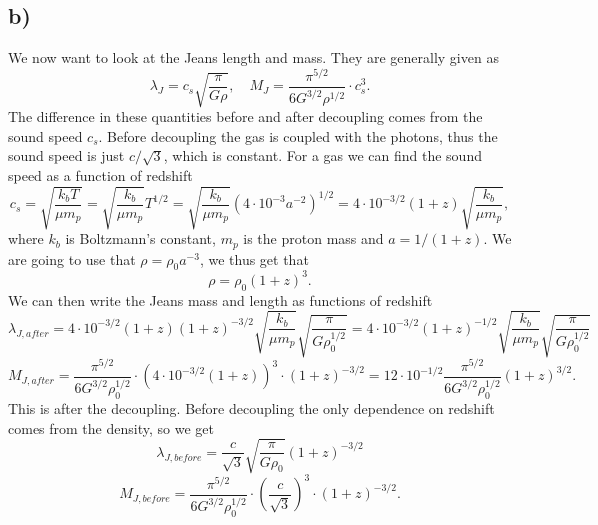 \documentclass[a4paper,norsk, 10pt]{article}
\begin{document}
\subsection{b)}
We now want to look at the Jeans length and mass. They are generally given as
\begin{equation}
\lambda_{J} = c_{s}\sqrt{\frac{\pi}{G \rho}}, \quad M_{J} = \frac{\pi^{5/2}}{6G^{3/2}\rho^{1/2}}\cdot c_s^{3}.
\end{equation}
The difference in these quantities before and after decoupling comes from the sound speed $c_s$. Before decoupling the gas is coupled with the photons, thus the sound speed is just $c/\sqrt{3}$, which is constant. For a gas we can find the sound speed as a function of redshift
\begin{equation}
c_s = \sqrt{\frac{k_b T}{\mu m_p}} = \sqrt{\frac{k_b}{\mu m_p}}T^{1/2} = \sqrt{\frac{k_b}{\mu m_p}}\left(4\cdot 10^{-3}a^{-2}\right)^{1/2} = 4\cdot 10^{-3/2}(1+z)\sqrt{\frac{k_b}{\mu m_p}},
\end{equation}
where $k_b$ is Boltzmann's constant, $m_p$ is the proton mass and $a = 1/(1+z)$. We are going to use that $\rho = \rho_0 a^{-3}$, we thus get that 
\begin{equation}
\rho = \rho_0 (1+z)^3.
\end{equation}
We can then write the Jeans mass and length as functions of redshift
\begin{equation}
\lambda_{J,after} = 4\cdot 10^{-3/2}(1+z)(1+z)^{-3/2}\sqrt{\frac{k_b}{\mu m_p}}\sqrt{\frac{\pi}{G \rho_0^{1/2}}} =4\cdot 10^{-3/2}(1+z)^{-1/2} \sqrt{\frac{k_b}{\mu m_p}}\sqrt{\frac{\pi}{G \rho_0^{1/2}}}
\end{equation}
\begin{equation}
M_{J,after} = \frac{\pi^{5/2}}{6G^{3/2}\rho_0^{1/2}}\cdot \left(4\cdot 10^{-3/2}(1+z)\right)^{3}\cdot (1+z)^{-3/2} = 12\cdot 10^{-1/2}\frac{\pi^{5/2}}{6G^{3/2}\rho_0^{1/2}}(1+z)^{3/2}.
\end{equation}
This is after the decoupling. Before decoupling the only dependence on redshift comes from the density, so we get
\begin{equation}
\lambda_{J,before} = \frac{c}{\sqrt{3}}\sqrt{\frac{\pi}{G \rho_0}}(1+z)^{-3/2}
\end{equation}
\begin{equation}
M_{J,before} = \frac{\pi^{5/2}}{6G^{3/2}\rho_0^{1/2}}\cdot \left(\frac{c}{\sqrt{3}}\right)^3\cdot(1+z)^{-3/2}.
\end{equation}
\end{document}
